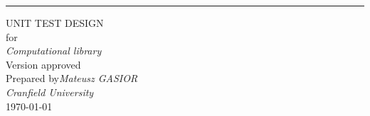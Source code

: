 \begin{flushright}
    \rule{16cm}{5pt}\vskip1cm
    \begin{bfseries}
        \Huge{UNIT TEST DESIGN}\\
        \vspace{1.9cm}
        for\\
        \vspace{1.9cm}
	    \textit{Computational library}\\
        \vspace{1.9cm}
        \LARGE{Version \myversion approved}\\
        \vspace{1.9cm}
        Prepared by\textit{Mateusz GASIOR}\\
        \vspace{1.9cm}
        \textit{Cranfield University}\\
        \vspace{1.9cm}
        \today\\
    \end{bfseries}
\end{flushright}